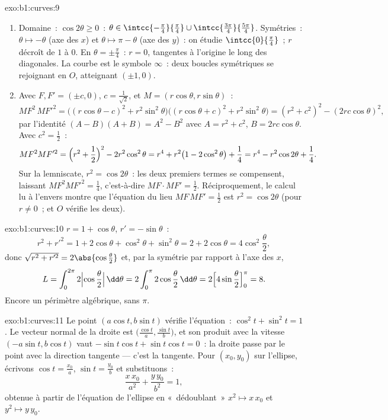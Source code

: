 \begin{solution}{exo:b1:curves:9}
\begin{enumerate}
  \item Domaine~: $\cos 2\theta \geq 0$~: $\theta \in
        \intcc{-\frac\pi4}{\frac\pi4} \cup
        \intcc{\frac{3\pi}{4}}{\frac{5\pi}{4}}$. Symétries~: $\theta
        \mapsto -\theta$ (axe des $x$) et $\theta \mapsto \pi -
        \theta$ (axe des $y$)~: on étudie $\intcc{0}{\frac\pi4}$~; $r$
        décroît de $1$ à $0$. En $\theta = \pm\frac\pi4$~: $r =
        0$, tangentes à l'origine le long des diagonales. La courbe est
        le symbole $\infty$~: deux boucles symétriques se rejoignant en $O$,
        atteignant $(\pm 1, 0)$.
  \item Avec $F, F' = (\pm c, 0)$, $c = \frac{1}{\sqrt 2}$, et $M
        = (r\cos\theta, r\sin\theta)$~:
        \[
        MF^2\, MF'^2
        = \bigl((r\cos\theta - c)^2 + r^2\sin^2\theta\bigr)
        \bigl((r\cos\theta + c)^2 + r^2\sin^2\theta\bigr)
        = (r^2 + c^2)^2 - (2rc\cos\theta)^2 ,
        \]
        par l'identité $(A - B)(A + B) = A^2 - B^2$ avec $A = r^2
        + c^2$, $B = 2rc\cos\theta$. Avec $c^2 = \frac12$~:
        \[
        MF^2 MF'^2 = \Bigl(r^2 + \frac12\Bigr)^2 - 2r^2\cos^2\theta
        = r^4 + r^2\bigl(1 - 2\cos^2\theta\bigr) + \frac14
        = r^4 - r^2\cos 2\theta + \frac14 .
        \]
        Sur la lemniscate, $r^2 = \cos 2\theta$~: les deux premiers termes
        se compensent, laissant $MF^2MF'^2 = \frac14$, c'est-à-dire $MF \cdot MF' =
        \frac12$. Réciproquement, le calcul lu à l'envers montre que
        l'équation du lieu $MF\,MF' = \frac12$ est $r^2 = \cos
        2\theta$ (pour $r \neq 0$~; et $O$ vérifie les deux).
\end{enumerate}
\end{solution}

\begin{solution}{exo:b1:curves:10}
$r = 1 + \cos\theta$, $r' = -\sin\theta$~:
\[
r^2 + r'^2 = 1 + 2\cos\theta + \cos^2\theta + \sin^2\theta
= 2 + 2\cos\theta = 4\cos^2\frac\theta2 ,
\]
donc $\sqrt{r^2 + r'^2} = 2\abs{\cos\frac\theta2}$ et, par la
symétrie par rapport à l'axe des $x$,
\[
L = \int_0^{2\pi} 2\Bigl|\cos\frac\theta2\Bigr|\,\dd\theta
= 2\int_0^{\pi} 2\cos\frac\theta2\,\dd\theta
= 2\Bigl[4\sin\frac\theta2\Bigr]_0^{\pi} = 8 .
\]
Encore un périmètre algébrique, sans $\pi$.
\end{solution}

\begin{solution}{exo:b1:curves:11}
Le point $(a\cos t, b\sin t)$ vérifie l'équation~:
$\cos^2 t + \sin^2 t = 1$. Le vecteur normal de la droite est
$\bigl(\frac{\cos t}a, \frac{\sin t}b\bigr)$, et son produit
avec la vitesse $(-a\sin t, b\cos t)$ vaut $-\sin t\cos t +
\sin t\cos t = 0$~: la droite passe par le point avec la
direction tangente --- c'est la tangente. Pour $(x_0, y_0)$ sur
l'ellipse, écrivons $\cos t = \frac{x_0}a$, $\sin t = \frac{y_0}b$ et
substituons~:
\[
\frac{x\,x_0}{a^2} + \frac{y\,y_0}{b^2} = 1 ,
\]
obtenue à partir de l'équation de l'ellipse en «~dédoublant~» $x^2 \mapsto
x\,x_0$ et $y^2 \mapsto y\,y_0$.
\end{solution}

